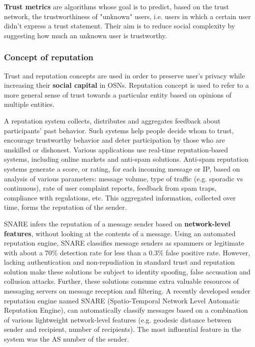 \textbf{Trust metrics} are algorithms whose goal is to predict,
	based on the trust network,
	the trustworthiness of "unknown" users,
	i.e. users in which a certain user didn’t express a trust statement.
Their aim is to reduce social complexity by suggesting how much an unknown user is trustworthy.

\subsubsection{Concept of reputation}

Trust and reputation concepts are used in order to preserve user’s privacy while increasing their \textbf{social capital} in OSNs.
Reputation concept is used to refer to a more general sense of trust towards a particular entity based on opinions of multiple entities.

A reputation system collects,
	distributes and aggregates feedback about participants’ past behavior.
Such systems help people decide whom to trust,
	encourage trustworthy behavior and deter participation by those who are unskilled or dishonest.
Various applications use real-time reputation-based systems,
	including online markets and anti-spam solutions.
Anti-spam reputation systems generate a score,
	or rating,
	for each incoming message or IP,
	based on analysis of various parameters: message volume,
	type of traffic (e.g. sporadic vs continuous),
	rate of user complaint reports,
	feedback from spam traps,
	compliance with regulations,
	etc.
This aggregated information,
	collected over time,
	forms the reputation of the sender.

SNARE \cite{hao_detecting_2009} infers the reputation of a message sender based on \textbf{network-level features},
	without looking at the contents of a message.
Using an automated reputation engine,
	SNARE classifies message senders as spammers or legitimate with about a 70\% detection rate for less than a 0.3\% false positive rate.
However,
	lacking authentication and non-repudiation in standard trust and reputation solution make these solutions be subject to identity spoofing,
	false accusation and collusion attacks.
Further,
	these solutions consume extra valuable resources of messaging servers on message reception and filtering.
A recently developed sender reputation engine named SNARE (Spatio-Temporal Network Level Automatic Reputation Engine),
	can automatically classify messages based on a combination of various lightweight network-level features 
	(e.g. geodesic distance between sender and recipient, number of recipients).
The most influential feature in the system was the AS number of the sender.

